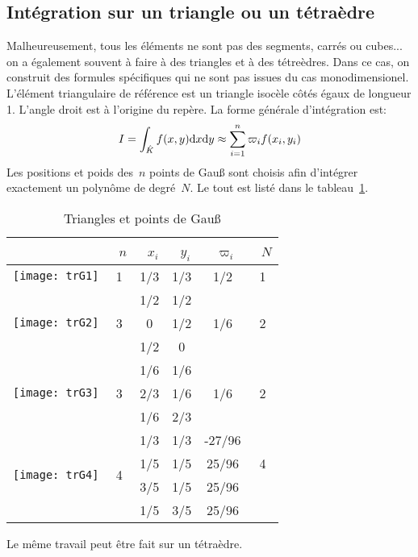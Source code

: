 \subsection*{Intégration sur un triangle ou un tétraèdre} 
Malheureusement, tous les éléments ne sont pas des segments, carrés ou cubes... on a également souvent à faire à des triangles et à des tétreèdres. Dans ce cas, on construit des formules spécifiques qui ne sont pas issues du cas monodimensionel. L'élément triangulaire de référence est un triangle isocèle côtés égaux de longueur 1. L'angle droit est à l'origine du repère. La forme générale d'intégration est: 
\begin{equation}
 I=\int_{\hat{K}} f(x,y)\text{d} x\text{d} y \approx \sum_{i=1}^n \varpi_if(x_i,y_i) 
\end{equation}
Les positions et poids des~$n$ points de Gauß sont choisis afin d'intégrer exactement un polynôme de degré~$N$. Le tout est listé dans le tableau~\ref{tab:IntNum:TriGauss}.
\begin{table}[ht]\centering
\begin{tabular}{cccccc} &~$n$ &~$x_i$ &~$y_i$ &~$\varpi_i$ &~$N$\\ \hline \texttt{[image: trG1]} & 1 & 1/3 & 1/3 & 1/2 & 1\\ \hline \multirow{3}{*}{\texttt{[image: trG2]}} & \multirow{3}{*}{3} & 1/2 & 1/2 & \multirow{3}{*}{1/6} & \multirow{3}{*}{2}\\[+2mm] &&0&1/2&&\\[+2mm] &&1/2&0&&\\[+12mm] \hline \multirow{3}{*}{\texttt{[image: trG3]}} & \multirow{3}{*}{3} & 1/6 & 1/6 & \multirow{3}{*}{1/6} & \multirow{3}{*}{2}\\[+2mm] &&2/3 & 1/6 &&\\[+2mm] &&1/6&2/3&&\\[+12mm] \hline \multirow{4}{*}{\texttt{[image: trG4]}} & \multirow{4}{*}{4} & 1/3 & 1/3 & -27/96 & \multirow{3}{*}{4}\\[+2mm] &&1/5&1/5&25/96&\\[+2mm] &&3/5&1/5&25/96&\\[+2mm] &&1/5&3/5&25/96&\\[+12mm] 
\end{tabular} 
\caption{Triangles et points de Gauß}\label{tab:IntNum:TriGauss}
\end{table} 
 Le même travail peut être fait sur un tétraèdre. 
